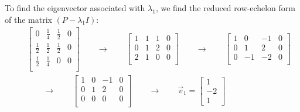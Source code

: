 To find the eigenvector associated with $\lambda_1$, we find the reduced row-echelon form of the matrix $(P-\lambda_1 I)$:
\begin{eqnarray*}
  &&\left[\begin{array}{ccc|c}
	0&\frac{1}{4}&\frac{1}{2}&0\\\frac{1}{2}&\frac{1}{2}&\frac{1}{2}&0\\ \frac{1}{2}&\frac{1}{4}&0&0\\
        \end{array}\right]\qquad\rightarrow\qquad
	\left[\begin{array}{ccc|c}
	1&1&1&0\\0&1&2&0\\2&1&0&0\\
        \end{array}\right]\qquad\rightarrow\qquad
	\left[\begin{array}{ccc|c}
	1&0&-1&0\\0&1&2&0\\0&-1&-2&0\\
        \end{array}\right]\\
	&&\qquad\rightarrow\qquad
	\left[\begin{array}{ccc|c}
	1&0&-1&0\\0&1&2&0\\0&0&0&0\\
        \end{array}\right]\qquad\rightarrow\qquad
	\vec{v}_1=\left[\begin{array}{c}1\\-2\\1\end{array}\right]
\end{eqnarray*}

